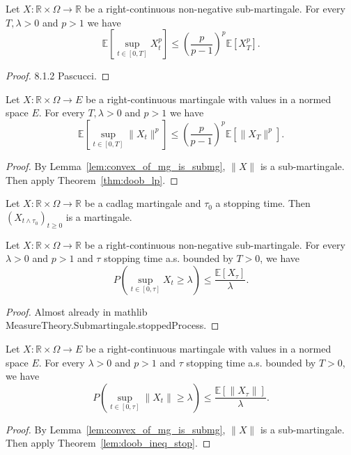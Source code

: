 \begin{theorem}\label{thm:doob_lp}
  Let $X:\mathbb{R}\times\Omega\rightarrow \mathbb{R}$ be a right-continuous non-negative sub-martingale.
  For every $T, \lambda>0$ and $p>1$ we have
  $$
  \mathbb{E}\left[ \sup_{t\in[0,T]}X_t^p \right]\leq \left(\frac{p}{p-1}\right)^p\mathbb{E}[X_T^p].
  $$
\end{theorem}
\begin{proof}
  8.1.2 Pascucci.
\end{proof}

\begin{corollary}\label{cor:doob_lp}
  Let $X : \mathbb{R}\times\Omega\rightarrow E$ be a right-continuous martingale with values in a normed space $E$.
  For every $T, \lambda>0$ and $p>1$ we have
  $$
  \mathbb{E}\left[ \sup_{t\in[0,T]} \lVert X_t \rVert ^p \right]\leq \left(\frac{p}{p-1}\right)^p\mathbb{E}[\lVert X_T \rVert ^p].
  $$
\end{corollary}
\begin{proof}
  By Lemma~\ref{lem:convex_of_mg_is_submg}, $\lVert X \rVert$ is a sub-martingale.
  Then apply Theorem~\ref{thm:doob_lp}.
\end{proof}

\begin{lemma}\label{lem:stop_of_mg_is_mg}
  Let $X:\mathbb{R}\times\Omega\rightarrow \mathbb{R}$ be a cadlag martingale and $\tau_0$ a stopping time. Then $(X_{t\wedge\tau_0})_{t\geq 0}$ is a martingale.
\end{lemma}

\begin{lemma}\label{lem:doob_ineq_stop}
  Let $X:\mathbb{R}\times\Omega\rightarrow \mathbb{R}$ be a right-continuous non-negative sub-martingale.
  For every $\lambda>0$ and $p>1$ and $\tau$ stopping time a.s. bounded by $T>0$, we have
  $$
  P\left( \sup_{t\in[0,\tau]}X_t\geq\lambda \right)\leq \frac{\mathbb{E}[X_\tau]}{\lambda}.
  $$
\end{lemma}
\begin{proof}
  Almost already in mathlib MeasureTheory.Submartingale.stoppedProcess.
\end{proof}

\begin{corollary}\label{cor:doob_ineq_stop}
  Let $X:\mathbb{R}\times\Omega\rightarrow E$ be a right-continuous martingale with values in a normed space $E$.
  For every $\lambda>0$ and $p>1$ and $\tau$ stopping time a.s. bounded by $T>0$, we have
  $$
  P\left( \sup_{t\in[0,\tau]}\lVert X_t \rVert \geq\lambda \right)\leq \frac{\mathbb{E}[\lVert X_\tau \rVert]}{\lambda}.
  $$
\end{corollary}
\begin{proof}
  By Lemma~\ref{lem:convex_of_mg_is_submg}, $\lVert X \rVert$ is a sub-martingale.
  Then apply Theorem~\ref{lem:doob_ineq_stop}.
\end{proof}

